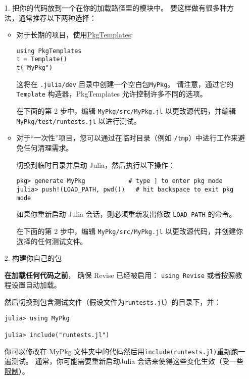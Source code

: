 \begin{itemize}
\item[1. ] 把你的代码放到一个在你的加载路径里的模块中。 要这样做有很多种方法，通常推荐以下两种选择：

\begin{itemize}
\item 对于长期的项目，使用\href{https://github.com/invenia/PkgTemplates.jl}{PkgTemplates}:


\begin{verbatim}
using PkgTemplates
t = Template()
t("MyPkg")
\end{verbatim}

这将在 \texttt{.julia/dev} 目录中创建一个空白包\texttt{{\textquotedbl}MyPkg{\textquotedbl}}。 请注意，通过它的 \texttt{Template} 构造器，PkgTemplates 允许控制许多不同的选项。

在下面的第 2 步中，编辑 \texttt{MyPkg/src/MyPkg.jl} 以更改源代码，并编辑 \texttt{MyPkg/test/runtests.jl} 以进行测试。


\item 对于“一次性”项目，您可以通过在临时目录（例如 \texttt{/tmp}）中进行工作来避免任何清理需求。

切换到临时目录并启动 Julia，然后执行以下操作：


\begin{verbatim}
pkg> generate MyPkg            # type ] to enter pkg mode
julia> push!(LOAD_PATH, pwd())   # hit backspace to exit pkg mode
\end{verbatim}

如果你重新启动 Julia 会话，则必须重新发出修改 \texttt{LOAD\_PATH} 的命令。

在下面的第 2 步中，编辑 \texttt{MyPkg/src/MyPkg.jl} 以更改源代码，并创建你选择的任何测试文件。

\end{itemize}

\item[2. ] 构建你自己的包

\textbf{在加载任何代码之前}， 确保 Revise 已经被启用： \texttt{using Revise} 或者按照教程设置自动加载。

然后切换到包含测试文件（假设文件为\texttt{{\textquotedbl}runtests.jl{\textquotedbl}}）的目录下，并：


\begin{verbatim}
julia> using MyPkg

julia> include("runtests.jl")
\end{verbatim}

你可以修改在 MyPkg 文件夹中的代码然后用\texttt{include({\textquotedbl}runtests.jl{\textquotedbl})}重新跑一遍测试。 通常，你可能需要重新启动Julia 会话来使得这些变化生效（受一些 \href{https://timholy.github.io/Revise.jl/stable/limitations/}{限制}）。

\end{itemize}


